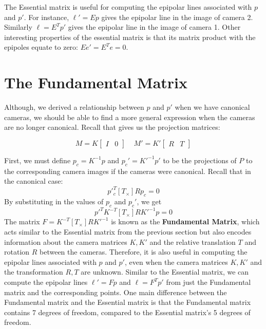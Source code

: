 \documentclass[a4paper, 12pt]{article}
\renewcommand\emph{\textbf}
\begin{document}
The Essential matrix is useful for computing the epipolar lines associated with $p$ and $p'$. For instance, $\ell' = Ep$ gives the epipolar line in the image of camera 2. Similarly $\ell = E^Tp'$ gives the epipolar line in the image of camera 1. Other interesting properties of the essential matrix is that its matrix product with the epipoles equate to zero: $Ee' = E^Te = 0$. 


\section{The Fundamental Matrix}
Although, we derived a relationship between $p$ and $p'$ when we have canonical cameras, we should be able to find a more general expression when the cameras are no longer canonical. Recall that gives us the projection matrices:

\begin{equation}
    M = K\begin{bmatrix} I & 0\end{bmatrix} \ \ \ \ \ M' = K'\begin{bmatrix}R & T\end{bmatrix}
    \label{eq:projection_matrices2}
\end{equation}

First, we must define $p_c = K^{-1}p$ and $p_c' = K'^{-1}p'$ to be the projections of $P$ to the corresponding camera images if the cameras were canonical. Recall that in the canonical case:
\begin{equation}
    p'^T_c [T_\times]Rp_c = 0
    \label{eq:canonical_constraint}
\end{equation}
By substituting in the values of $p_c$ and $p_c'$, we get
\begin{equation}
    p'^TK^{-T} [T_\times]RK'^{-1}p = 0
    \label{eq:canonical_constraint_substitute}
\end{equation}
The matrix $F = K^{-T} [T_\times]RK'^{-1}$ is known as the \emph{Fundamental Matrix}, which acts similar to the Essential matrix from the previous section but also encodes information about the camera matrices $K, K'$ and the relative translation $T$ and rotation $R$ between the cameras. Therefore, it is also useful in computing the epipolar lines associated with $p$ and $p'$, even when the camera matrices $K, K'$ and the transformation $R,T$ are unknown. Similar to the Essential matrix, we can compute the epipolar lines $\ell' = Fp$ and $\ell = F^T p'$ from just the Fundamental matrix and the corresponding points. One main difference between the Fundamental matrix and the Essential matrix is that the Fundamental matrix contains 7 degrees of freedom, compared to the Essential matrix's 5 degrees of freedom.
\end{document}
